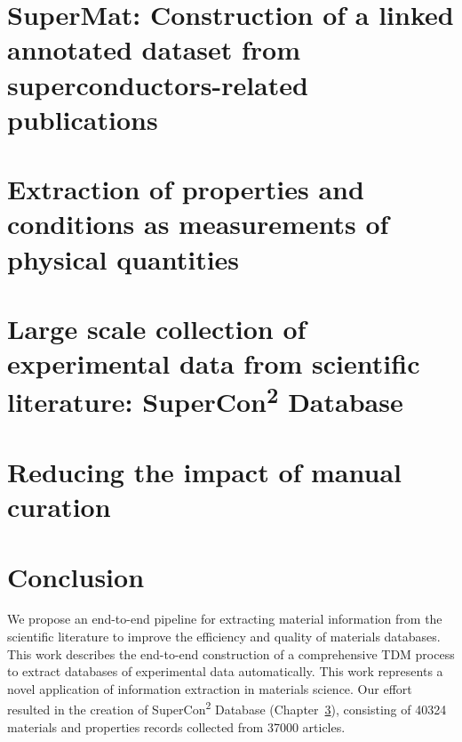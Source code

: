 \documentclass[a4paper,11pt]{report}
\begin{document}
\chapter{SuperMat: Construction of a linked annotated dataset from superconductors-related publications}
\label{cha:supermat}


\chapter{Extraction of properties and conditions as measurements of physical quantities}
\label{cha:measurements}


\chapter{Large scale collection of experimental data from scientific literature: SuperCon\texorpdfstring{\textsuperscript{2}}{2} Database}
\label{cha:supercon2}


\chapter{Reducing the impact of manual curation}
\label{cha:curation}


\chapter{Conclusion}
We propose an end-to-end pipeline for extracting material information from the scientific literature to improve the efficiency and quality of materials databases.
This work describes the end-to-end construction of a comprehensive TDM process to extract databases of experimental data automatically. 
This work represents a novel application of information extraction in materials science. 
Our effort resulted in the creation of SuperCon\textsuperscript{2} Database (Chapter~\ref{cha:supercon2}), consisting of 40324 materials and properties records collected from 37000 articles.
\end{document}
